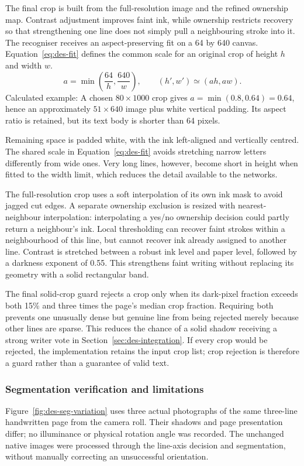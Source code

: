 The final crop is built from the full-resolution image and the refined ownership map. Contrast adjustment improves faint ink, while ownership restricts recovery so that strengthening one line does not simply pull a neighbouring stroke into it. The recogniser receives an aspect-preserving fit on a 64 by 640 canvas. Equation~\ref{eq:des-fit} defines the common scale for an original crop of height $h$ and width $w$.
\begin{equation}
a=\min\left(\frac{64}{h},\frac{640}{w}\right),\qquad
(h',w')\simeq(ah,aw).
\label{eq:des-fit}
\end{equation}
Calculated example: A chosen $80\times1000$ crop gives $a=\min(0.8,0.64)=0.64$, hence an approximately $51\times640$ image plus white vertical padding. Its aspect ratio is retained, but its text body is shorter than 64 pixels.

Remaining space is padded white, with the ink left-aligned and vertically centred. The shared scale in Equation~\ref{eq:des-fit} avoids stretching narrow letters differently from wide ones. Very long lines, however, become short in height when fitted to the width limit, which reduces the detail available to the networks.

The full-resolution crop uses a soft interpolation of its own ink mask to avoid jagged cut edges. A separate ownership exclusion is resized with nearest-neighbour interpolation: interpolating a yes/no ownership decision could partly return a neighbour's ink. Local thresholding can recover faint strokes within a neighbourhood of this line, but cannot recover ink already assigned to another line. Contrast is stretched between a robust ink level and paper level, followed by a darkness exponent of 0.55. This strengthens faint writing without replacing its geometry with a solid rectangular band.

The final solid-crop guard rejects a crop only when its dark-pixel fraction exceeds both 15\% and three times the page's median crop fraction. Requiring both prevents one unusually dense but genuine line from being rejected merely because other lines are sparse. This reduces the chance of a solid shadow receiving a strong writer vote in Section~\ref{sec:des-integration}. If every crop would be rejected, the implementation retains the input crop list; crop rejection is therefore a guard rather than a guarantee of valid text.

\subsubsection{Segmentation verification and limitations}
\label{sec:des-segverify}
Figure~\ref{fig:des-seg-variation} uses three actual photographs of the same three-line handwritten page from the camera roll. Their shadows and page presentation differ; no illuminance or physical rotation angle was recorded. The unchanged native images were processed through the line-axis decision and segmentation, without manually correcting an unsuccessful orientation.


